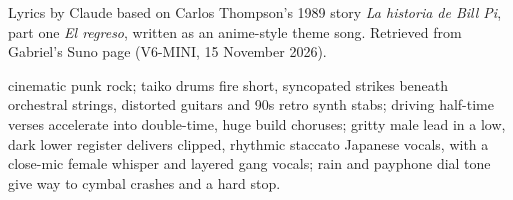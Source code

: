
\begin{notes}
Lyrics by Claude based on Carlos Thompson's 1989 story \emph{La historia de Bill Pi}, part one \emph{El regreso}, written as an anime-style theme song. Retrieved from Gabriel's Suno page (V6-MINI, 15 November 2026).
\end{notes}
\begin{style}
cinematic punk rock; taiko drums fire short, syncopated strikes beneath orchestral strings, distorted guitars and 90s retro synth stabs; driving half-time verses accelerate into double-time, huge build choruses; gritty male lead in a low, dark lower register delivers clipped, rhythmic staccato Japanese vocals, with a close-mic female whisper and layered gang vocals; rain and payphone dial tone give way to cymbal crashes and a hard stop.
\end{style}
